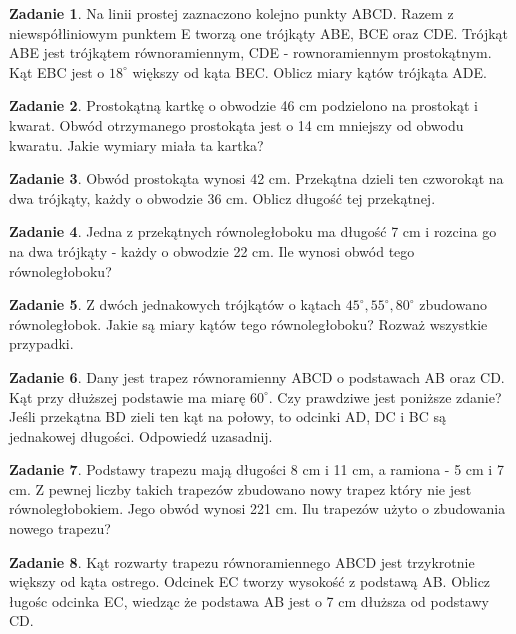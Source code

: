 \documentclass[11pt]{article}
\theoremstyle{definition}
\newtheorem{zad}{Zadanie}
\numberwithin{zad}{section}
\begin{document}
\begin{zad}
Na linii prostej zaznaczono kolejno punkty ABCD. Razem z niewspółliniowym punktem E tworzą one trójkąty ABE, BCE oraz CDE. Trójkąt ABE jest trójkątem równoramiennym, CDE - rownoramiennym prostokątnym. Kąt EBC jest o $18^\circ$ większy od kąta BEC. Oblicz miary kątów trójkąta ADE.
\end{zad}

\begin{zad}
Prostokątną kartkę o obwodzie 46 cm podzielono na prostokąt i kwarat. Obwód otrzymanego prostokąta jest o 14 cm mniejszy od obwodu kwaratu. Jakie wymiary miała ta kartka?
\end{zad}

\begin{zad}
Obwód prostokąta wynosi 42 cm. Przekątna dzieli ten czworokąt na dwa trójkąty, każdy o obwodzie 36 cm. Oblicz długość tej przekątnej.
\end{zad}

\begin{zad}
Jedna z przekątnych równoległoboku ma długość 7 cm i rozcina go na dwa trójkąty - każdy o obwodzie 22 cm. Ile wynosi obwód tego równoległoboku?
\end{zad}

\begin{zad}
Z dwóch jednakowych trójkątów o kątach $45^\circ, 55^\circ, 80^\circ$ zbudowano równoległobok. Jakie są miary kątów tego równoległoboku? Rozważ wszystkie przypadki.
\end{zad}


\begin{zad}
Dany jest trapez równoramienny ABCD o podstawach AB oraz CD. Kąt przy dłuższej podstawie ma miarę $60^\circ$. Czy prawdziwe jest  poniższe zdanie? Jeśli przekątna BD zieli ten kąt na połowy, to odcinki AD, DC i BC są jednakowej długości. Odpowiedź uzasadnij.
\end{zad}

\begin{zad}
Podstawy trapezu mają długości 8 cm i 11 cm, a ramiona - 5 cm i 7 cm. Z pewnej liczby takich trapezów zbudowano nowy trapez który nie jest równoległobokiem. Jego obwód wynosi 221 cm. Ilu trapezów użyto o zbudowania nowego trapezu?\end{zad}

\begin{zad}
Kąt rozwarty trapezu równoramiennego ABCD jest trzykrotnie większy od kąta ostrego. Odcinek EC tworzy wysokość z podstawą AB. Oblicz ługośc odcinka EC, wiedząc że podstawa AB jest o 7 cm dłuższa od podstawy CD.
\end{zad}
\end{document}
